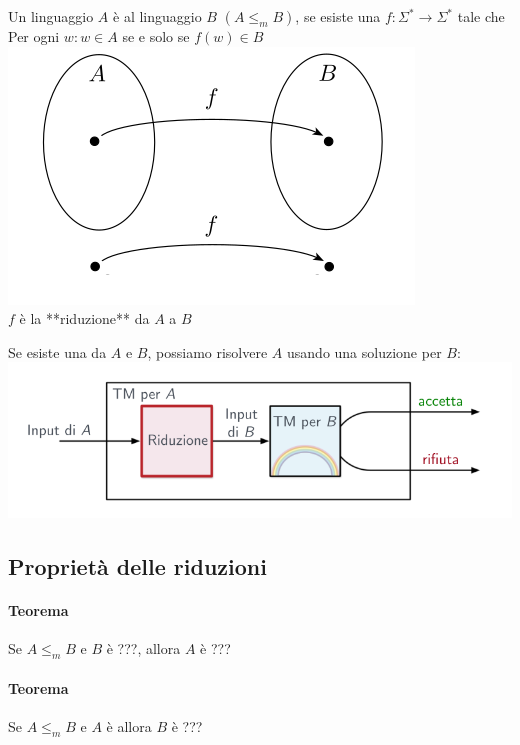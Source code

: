 Un linguaggio $A$ è  al linguaggio $B$ $(A\leq_m B)$, se esiste una  $f:\Sigma^*\rightarrow\Sigma^*$ tale che 
Per ogni $w:w\in A$ se e solo se $f(w)\in B$ \\
\includegraphics[scale=0.5]{img/funzione_riduzione.png}\\
$f$ è la **riduzione** da $A$ a $B$ 

Se esiste una  da $A$ e $B$, possiamo risolvere $A$ usando una soluzione per $B$: \\
\includegraphics[scale=0.5]{img/schema_riducibilita.png}
\subsection{Proprietà delle riduzioni}
\paragraph{Teorema}
Se $A\leq_m B$ e $B$ è ???, allora $A$  è ??? 
\paragraph{Teorema}
Se $A\leq_m B$ e $A$ è  allora $B$ è ??? 


